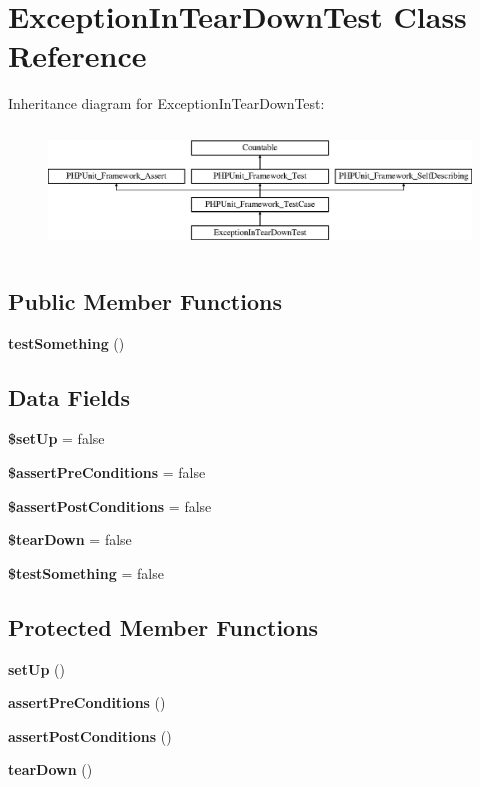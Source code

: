 \section{Exception\+In\+Tear\+Down\+Test Class Reference}
\label{class_exception_in_tear_down_test}
Inheritance diagram for Exception\+In\+Tear\+Down\+Test\+:\begin{figure}[H]
\begin{center}
\leavevmode
\includegraphics[height=3.303835cm]{class_exception_in_tear_down_test}
\end{center}
\end{figure}
\subsection*{Public Member Functions}
\begin{DoxyCompactItemize}
\item 
{\bf test\+Something} ()
\end{DoxyCompactItemize}
\subsection*{Data Fields}
\begin{DoxyCompactItemize}
\item 
{\bf \$set\+Up} = false
\item 
{\bf \$assert\+Pre\+Conditions} = false
\item 
{\bf \$assert\+Post\+Conditions} = false
\item 
{\bf \$tear\+Down} = false
\item 
{\bf \$test\+Something} = false
\end{DoxyCompactItemize}
\subsection*{Protected Member Functions}
\begin{DoxyCompactItemize}
\item 
{\bf set\+Up} ()
\item 
{\bf assert\+Pre\+Conditions} ()
\item 
{\bf assert\+Post\+Conditions} ()
\item 
{\bf tear\+Down} ()
\end{DoxyCompactItemize}
